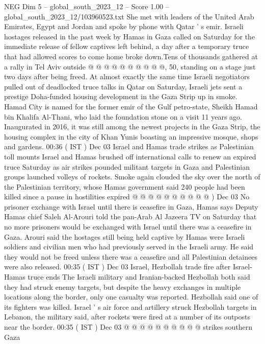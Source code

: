 \begin{textsample}{NEG Dim 5 – global\_south\_2023\_12 – Score 1.00 – global\_south\_2023\_12/103960523.txt}
She met with leaders of the United Arab Emirates, Egypt and Jordan and spoke by phone with Qatar ' s emir.
Israeli hostages released in the past week by Hamas in Gaza called on Saturday for the immediate release of fellow captives left behind, a day after a temporary truce that had allowed scores to come home broke down.Tens of thousands gathered at a rally in Tel Aviv outside @ @ @ @ @ @ @ @ @ @, 50, standing on a stage just two days after being freed.
At almost exactly the same time Israeli negotiators pulled out of deadlocked truce talks in Qatar on Saturday, Israeli jets sent a prestige Doha-funded housing development in the Gaza Strip up in smoke.
Hamad City is named for the former emir of the Gulf petro-state, Sheikh Hamad bin Khalifa Al-Thani, who laid the foundation stone on a visit 11 years ago.
Inaugurated in 2016, it was still among the newest projects in the Gaza Strip, the housing complex in the city of Khan Yunis boasting an impressive mosque, shops and gardens. 00:36 ( IST ) Dec 03 Israel and Hamas trade strikes as Palestinian toll mounts Israel and Hamas brushed off international calls to renew an expired truce Saturday as air strikes pounded militant targets in Gaza and Palestinian groups launched volleys of rockets.
Smoke again clouded the sky over the north of the Palestinian territory, whose Hamas government said 240 people had been killed since a pause in hostilities expired @ @ @ @ @ @ @ @ @ @ ) Dec 03 No prisoner exchange with Israel until there is ceasefire in Gaza, Hamas says Deputy Hamas chief Saleh Al-Arouri told the pan-Arab Al Jazeera TV on Saturday that no more prisoners would be exchanged with Israel until there was a ceasefire in Gaza.
Arouri said the hostages still being held captive by Hamas were Israeli soldiers and civilian men who had previously served in the Israeli army.
He said they would not be freed unless there was a ceasefire and all Palestinian detainees were also released. 00:35 ( IST ) Dec 03 Israel, Hezbollah trade fire after Israel-Hamas truce ends The Israeli military and Iranian-backed Hezbollah both said they had struck enemy targets, but despite the heavy exchanges in multiple locations along the border, only one casualty was reported.
Hezbollah said one of its fighters was killed.
Israel ' s air force and artillery struck Hezbollah targets in Lebanon, the military said, after rockets were fired at a number of its outposts near the border. 00:35 ( IST ) Dec 03 @ @ @ @ @ @ @ @ @ @ strikes southern Gaza

\end{textsample}
